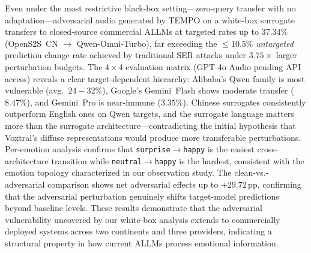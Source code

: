 Even under the most restrictive black-box setting---zero-query transfer with no adaptation---adversarial audio generated by TEMPO on a white-box surrogate transfers to closed-source commercial ALLMs at targeted rates up to $37.34\%$ (OpenS2S~CN $\to$ Qwen-Omni-Turbo), far exceeding the $\leq\!10.5\%$ \textit{untargeted} prediction change rate achieved by traditional SER attacks under $3.75\times$ larger perturbation budgets.
The $4 \times 4$ evaluation matrix (GPT-4o Audio pending API access) reveals a clear target-dependent hierarchy: Alibaba's Qwen family is most vulnerable (avg.\ $24{-}32\%$), Google's Gemini~Flash shows moderate transfer ($8.47\%$), and Gemini~Pro is near-immune ($3.35\%$).
Chinese surrogates consistently outperform English ones on Qwen targets, and the surrogate language matters more than the surrogate architecture---contradicting the initial hypothesis that Voxtral's diffuse representations would produce more transferable perturbations.
Per-emotion analysis confirms that \texttt{surprise}$\to$\texttt{happy} is the easiest cross-architecture transition while \texttt{neutral}$\to$\texttt{happy} is the hardest, consistent with the emotion topology characterized in our observation study.
The clean-vs.-adversarial comparison shows net adversarial effects up to $+29.72$\,pp, confirming that the adversarial perturbation genuinely shifts target-model predictions beyond baseline levels.
These results demonstrate that the adversarial vulnerability uncovered by our white-box analysis extends to commercially deployed systems across two continents and three providers, indicating a structural property in how current ALLMs process emotional information.
